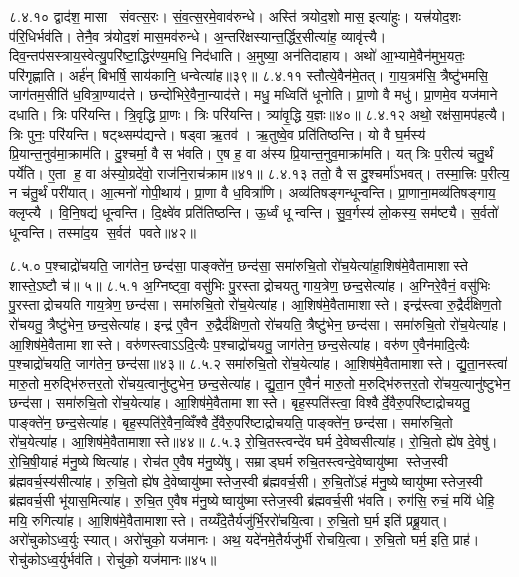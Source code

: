 ८.४.१०
द्वाद॑श॒ मासा संवत्स॒रः। सं॒व॒त्स॒रमे॒वाव॑रुन्धे। अस्ति॑ त्रयोद॒शो मास॒ इत्या॑हुः। यत्त्र॑योद॒शः प॑रि॒धिर्भव॑ति। तेनै॒व त्र॑योद॒शं मास॒मव॑रुन्धे। अ॒न्तरि॑क्षस्यान्त॒र्द्धिर॒सीत्या॑ह॒ व्यावृ॑त्त्यै। दिव॒न्तप॑सस्त्राय॒स्वेत्यु॒परि॑ष्टा॒द्धिर॑ण्य॒मधि॒ निद॑धाति। अ॒मुष्या॒ अन॑तिदाहाय। अथो॑ आ॒भ्यामे॒वैन॑मुभ॒यतः॒ परि॑गृह्णाति। अर्\mbox{}ह॑न् बिभर्\mbox{}षि॒ साय॑कानि॒ धन्वेत्या॑ह॥३९॥
८.४.११
स्तौत्ये॒वैन॑मे॒तत्। गा॒य॒त्रम॑सि॒ त्रैष्टु॑भमसि॒ जाग॑तम॒सीति॑ ध॒वित्रा॒ण्याद॑त्ते। छन्दो॑भिरे॒वैना॒न्याद॑त्ते। मधु॒ मध्विति॑ धूनोति। प्रा॒णो वै मधु॑। प्रा॒णमे॒व यज॑माने दधाति। त्रिः परि॑यन्ति। त्रि॒वृद्धि प्रा॒णः। त्रिः परि॑यन्ति। त्र्या॑वृ॒द्धि य॒ज्ञः॥४०॥
८.४.१२
अथो॒ रक्ष॑सा॒मप॑हत्यै। त्रिः पुनः॒ परि॑यन्ति। षट्थ्सम्प॑द्यन्ते। षड्वा ऋ॒तव॑। ऋ॒तुष्वे॒व प्रति॑तिष्ठन्ति। यो वै घ॒र्मस्य॑ प्रि॒यान्त॒नुव॑मा॒क्राम॑ति। दु॒श्चर्मा॒ वै स भ॑वति। ए॒ष ह॒ वा अ॑स्य प्रि॒यान्त॒नुव॒माक्रा॑मति। यत् त्रिः प॒रीत्य॑ चतु॒र्थं पर्ये॑ति। ए॒ता ह॒ वा अ॑स्यो॒ग्रदे॑वो॒ राज॑नि॒राच॑क्राम॥४१॥
८.४.१३
ततो॒ वै स दु॒श्चर्मा॑ऽभवत्। तस्मा॒त्त्रिः प॒रीत्य॒ न च॑तु॒र्थं परी॑यात्। आ॒त्मनो॑ गोपी॒थाय॑। प्रा॒णा वै ध॒वित्रा॑णि। अव्य॑तिषङ्गन्धून्वन्ति। प्रा॒णाना॒मव्य॑तिषङ्गाय॒ क्लृप्त्यै। वि॒नि॒षद्य॑ धून्वन्ति। दि॒क्ष्वे॑व प्रति॑तिष्ठन्ति। ऊ॒र्ध्वं धून्वन्ति। सु॒व॒र्गस्य॑ लो॒कस्य॒ सम॑ष्ट्यै। स॒र्वतो॑ धून्वन्ति। तस्मा॑द॒य स॒र्वत॑ पवते॥४२॥
\anuvakamend

८.५.०
प॒श्चाद्रो॑चयति॒ जाग॑तेन॒ छन्द॑सा॒ पाङ्क्ते॑न॒ छन्द॑सा॒ समा॑रुचि॒तो रो॑च॒येत्या॑हा॒शिष॑मे॒वैतामाशास्ते शास्ते॒ऽष्टौ च॑॥ ५॥
८.५.१
अ॒ग्निष्ट्वा॒ वसु॑भिः पु॒रस्ताद्रोचयतु गाय॒त्रेण॒ छन्द॒सेत्या॑ह। अ॒ग्निरे॒वैनं॒ वसु॑भिः पु॒रस्ताद्रोचयति गाय॒त्रेण॒ छन्द॑सा। समा॑रुचि॒तो रो॑च॒येत्या॑ह। आ॒शिष॑मे॒वैतामाशास्ते। इन्द्र॑स्त्वा रु॒द्रैर्द॑क्षिण॒तो रो॑चयतु॒ त्रैष्टु॑भेन॒ छन्द॒सेत्या॑ह। इन्द्र॑ ए॒वैन रु॒द्रैर्द॑क्षिण॒तो रो॑चयति॒ त्रैष्टु॑भेन॒ छन्द॑सा। समा॑रुचि॒तो रो॑च॒येत्या॑ह। आ॒शिष॑मे॒वैतामा शास्ते। वरु॑णस्त्वाऽऽदि॒त्यैः प॒श्चाद्रो॑चयतु॒ जाग॑तेन॒ छन्द॒सेत्या॑ह। वरु॑ण ए॒वैन॑मादि॒त्यैः प॒श्चाद्रो॑चयति॒ जाग॑तेन॒ छन्द॑सा॥४३॥
८.५.२
समा॑रुचि॒तो रो॑च॒येत्या॑ह। आ॒शिष॑मे॒वैतामाशास्ते। द्यु॒ता॒नस्त्वा॑ मारु॒तो म॒रुद्भि॑रुत्तर॒तो रो॑चय॒त्वानु॑ष्टुभेन॒ छन्द॒सेत्या॑ह। द्यु॒ता॒न ए॒वैनं॑ मारु॒तो म॒रुद्भि॑रुत्तर॒तो रो॑चय॒त्यानु॑ष्टुभेन॒ छन्द॑सा। समा॑रुचि॒तो रो॑च॒येत्या॑ह। आ॒शिष॑मे॒वैतामा शास्ते। बृह॒स्पति॑स्त्वा॒ विश्वैर्दे॒वैरु॒परि॑ष्टाद्रोचयतु॒ पाङ्क्ते॑न॒ छन्द॒सेत्या॑ह। बृह॒स्पति॑रे॒वैन॒व्विँश्वैर्दे॒वैरु॒परि॑ष्टाद्रोचयति॒ पाङ्क्ते॑न॒ छन्द॑सा। समा॑रुचि॒तो रो॑च॒येत्या॑ह। आ॒शिष॑मे॒वैतामाशास्ते॥४४॥
८.५.३
रो॒चि॒तस्त्वन्दे॑व घर्म दे॒वेष्वसीत्या॑ह। रो॒चि॒तो ह्ये॑ष दे॒वेषु॑। रो॒चि॒षी॒याहं म॑नु॒ष्येष्वित्या॑ह। रोच॑त ए॒वैष म॑नु॒ष्ये॑षु। सम्राड्घर्म रुचि॒तस्त्वन्दे॒वेष्वायु॑ष्मा स्तेज॒स्वी ब्र॑ह्मवर्च॒स्य॑सीत्या॑ह। रु॒चि॒तो ह्ये॑ष दे॒वेष्वायु॑ष्मास्तेज॒स्वी ब्र॑ह्मवर्च॒सी। रु॒चि॒तो॑ऽहं म॑नु॒ष्येष्वायु॑ष्मास्तेज॒स्वी ब्र॑ह्मवर्च॒सी भू॑यास॒मित्या॑ह। रु॒चि॒त ए॒वैष म॑नु॒ष्येष्वायु॑ष्मास्तेज॒स्वी ब्र॑ह्मवर्च॒सी भ॑वति। रुग॑सि॒ रुचं॒ मयि॑ धेहि॒ मयि॒ रुगित्या॑ह। आ॒शिष॑मे॒वैतामाशास्ते। तय्यँदे॒तैर्यजु॑र्भि॒ररो॑चयि॒त्वा। रु॒चि॒तो घ॒र्म इति॑ प्रब्रू॒यात्। अरो॑चुकोऽध्व॒र्युः स्यात्। अरो॑चुको॒ यज॑मानः। अथ॒ यदे॑नमे॒तैर्यजु॑र्भी रोचयि॒त्वा। रु॒चि॒तो घर्म॒ इति॒ प्राह॑। रोचु॑कोऽध्व॒र्युर्भव॑ति। रोचु॑को॒ यज॑मानः॥४५॥
\anuvakamend

